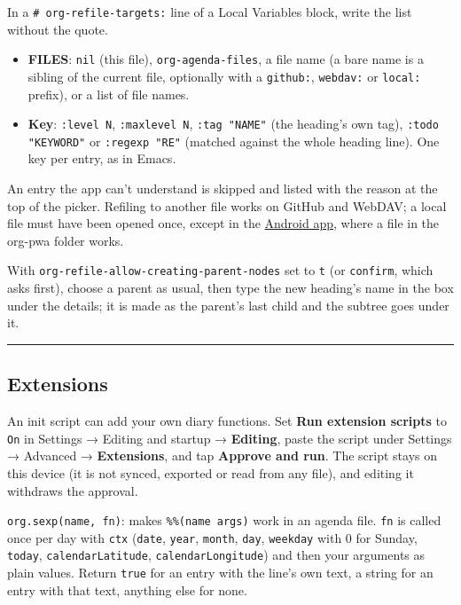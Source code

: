 \documentclass[11pt]{article}
\begin{document}
In a \texttt{\# org-refile-targets:} line of a Local Variables block, write the list without the quote.

\begin{itemize}
\item \textbf{FILES}: \texttt{nil} (this file), \texttt{org-agenda-files}, a file name (a bare name is a sibling of the current file, optionally with a \texttt{github:}, \texttt{webdav:} or \texttt{local:} prefix), or a list of file names.
\item \textbf{Key}: \texttt{:level N}, \texttt{:maxlevel N}, \texttt{:tag "NAME"} (the heading's own tag), \texttt{:todo "KEYWORD"} or \texttt{:regexp "RE"} (matched against the whole heading line). One key per entry, as in Emacs.
\end{itemize}

An entry the app can't understand is skipped and listed with the reason at the top of the picker. Refiling to another file works on GitHub and WebDAV; a local file must have been opened once, except in the \hyperref[sec:org5b8e0d4]{Android app}, where a file in the org-pwa folder works.

With \texttt{org-refile-allow-creating-parent-nodes} set to \texttt{t} (or \texttt{confirm}, which asks first), choose a parent as usual, then type the new heading's name in the box under the details; it is made as the parent's last child and the subtree goes under it.

\noindent\rule{\textwidth}{0.5pt}

\subsection{Extensions}
\label{sec:orgd63a52b}
An init script can add your own diary functions. Set \textbf{Run extension scripts} to \texttt{On} in Settings → Editing and startup → \textbf{Editing}, paste the script under Settings → Advanced → \textbf{Extensions}, and tap \textbf{Approve and run}. The script stays on this device (it is not synced, exported or read from any file), and editing it withdraws the approval.

\texttt{org.sexp(name, fn)}: makes \texttt{\%\%(name args)} work in an agenda file. \texttt{fn} is called once per day with \texttt{ctx} (\texttt{date}, \texttt{year}, \texttt{month}, \texttt{day}, \texttt{weekday} with 0 for Sunday, \texttt{today}, \texttt{calendarLatitude}, \texttt{calendarLongitude}) and then your arguments as plain values. Return \texttt{true} for an entry with the line's own text, a string for an entry with that text, anything else for none.
\end{document}
